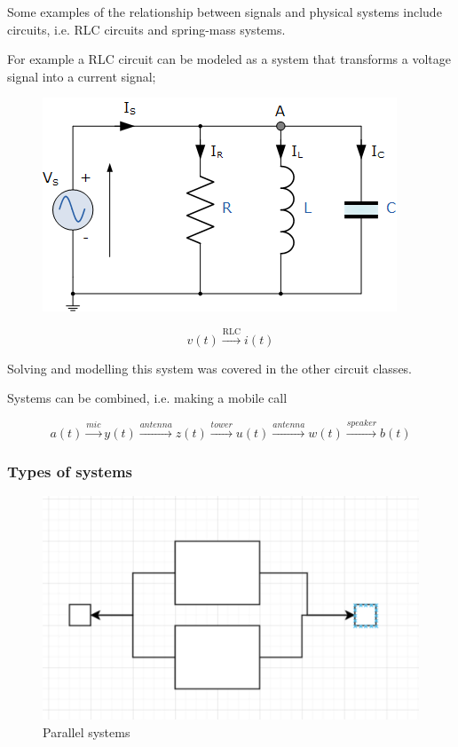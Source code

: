 \documentclass[../notes.tex]{subfiles}
\begin{document}
Some examples of the relationship between signals and physical systems include circuits, i.e. RLC circuits and spring-mass systems.

\begin{example}
	For example a RLC circuit can be modeled as a system that transforms a voltage signal into a current signal;
	\begin{figure}[H]
		\centering
		\includegraphics[width=0.8\linewidth]{img/image_2022-09-21-14-17-52.png}
	\end{figure}


	\begin{equation}
		v(t) \xrightarrow{\text{RLC}} i(t)
	\end{equation}

	Solving and modelling this system was covered in the other circuit classes.
\end{example}


Systems can be combined, i.e. making a mobile call

\begin{equation}
	a(t) \xrightarrow{mic} y(t) \xrightarrow{antenna} z(t) \xrightarrow{tower} u(t) \xrightarrow{antenna} w(t) \xrightarrow{speaker} b(t)
\end{equation}

\subsubsection{Types of systems}

\begin{figure}[H]
	\centering
	\includegraphics[width=0.8\linewidth]{img/image_2022-09-21-14-28-14.png}
	\caption{Parallel systems}
\end{figure}
\end{document}
